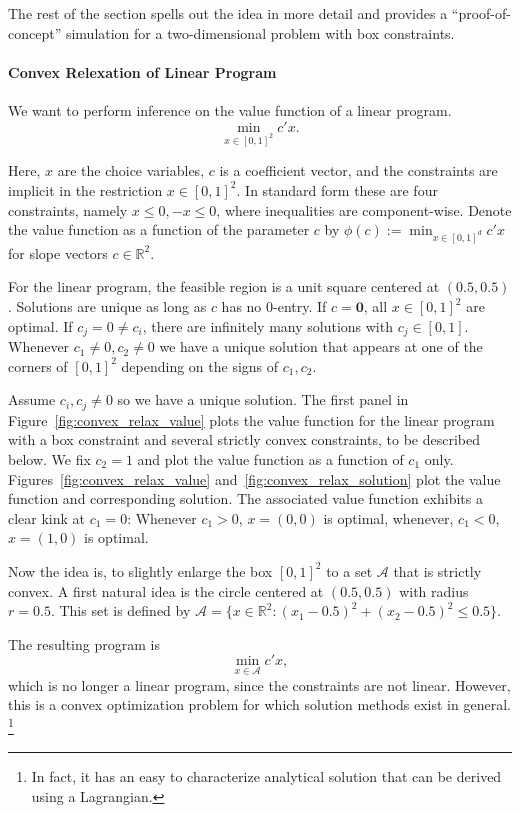 \documentclass[12pt,a4paper,english]{article} %
\numberwithin{equation}{section}
\theoremstyle{definition}
\theoremstyle{remark}
\theoremstyle{plain}
\begin{document}
The rest of the section spells out the idea in more detail and provides a ``proof-of-concept'' simulation for a two-dimensional problem with box constraints.

\paragraph{Convex Relexation of Linear Program}
We want to perform inference on the value function of a linear program.
\begin{equation}
	\min_{x\in [0,1]^2} c'x.
\end{equation}

Here, $x$ are the choice variables, $c$ is a coefficient vector, and the constraints are implicit in the restriction $x \in [0,1]^2$.
In standard form these are four constraints, namely $x \leq 0, -x \leq 0$, where inequalities are component-wise.
Denote the value function as a function of the parameter $c$ by $\phi(c) := \min_{x\in[0,1]^d} c'x$ for slope vectors $c\in \mathbb{R}^2$.

For the linear program, the feasible region is a unit square centered at $(0.5, 0.5)$. Solutions are unique as long as $c$ has no $0$-entry.
If $c=\mathbf{0}$, all $x\in [0,1]^2$ are optimal. If $c_j = 0 \neq c_i$, there are infinitely many solutions with $c_j \in [0,1]$.
Whenever $c_1\neq0, c_2\neq0$ we have a unique solution that appears at one of the corners of $[0,1]^2$ depending on the signs of $c_1, c_2$.

Assume $c_i, c_j \neq 0$ so we have a unique solution.
The first panel in Figure~\ref{fig:convex_relax_value} plots the value function for the linear program with a box constraint and several strictly convex constraints, to be described below.
We fix $c_2 = 1$ and plot the value function as a function of $c_1$ only.
Figures~\ref{fig:convex_relax_value} and~\ref{fig:convex_relax_solution} plot the value function and corresponding solution.
The associated value function exhibits a clear kink at $c_1 = 0$: Whenever $c_1 > 0$, $x = (0, 0)$ is optimal, whenever, $c_1 < 0$, $x=(1,0)$ is optimal.

Now the idea is, to slightly enlarge the box $[0,1]^2$ to a set $\mathcal{A}$ that is strictly convex.
A first natural idea is the circle centered at $(0.5, 0.5)$ with radius $r=0.5$.
This set is defined by $\mathcal{A} = \{x \in \mathbb{R}^2: (x_1 - 0.5)^2 + (x_2 - 0.5)^2 \leq 0.5\}$.

The resulting program is
\begin{equation}
	\min_{x\in\mathcal{A}} c'x,
\end{equation}
which is no longer a linear program, since the constraints are not linear.
However, this is a convex optimization problem for which solution methods exist in general.
\footnote{In fact, it has an easy to characterize analytical solution that can be derived using a Lagrangian.}
\end{document}
